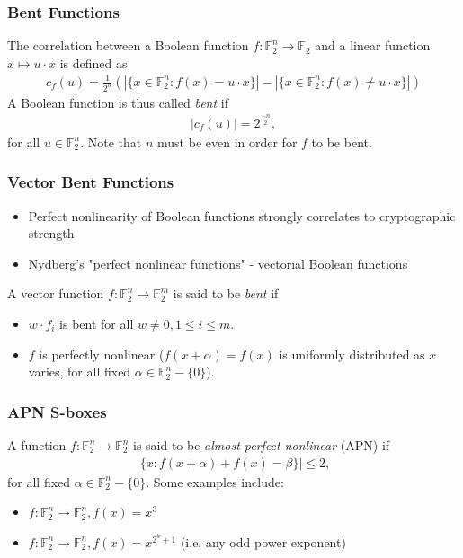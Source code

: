 \documentclass[handout]{beamer}
\newcommand{\field}[1]{\mathbb{#1}} %
\begin{document}
\begin{frame}
	\frametitle{Bent Functions}
	The correlation between a Boolean function $f : \field{F}_2^n \to \field{F}_2$ and a linear function $x \mapsto u \cdot x$ is defined as
	\begin{eqnarray*}
	c_f(u) = \frac{1}{2^n}(|\{x \in \field{F}_2^n : f(x) = u \cdot x\}| - |\{x \in \field{F}_2^n : f(x) \not= u \cdot x\}|)
	\end{eqnarray*}
	A Boolean function is thus called \emph{bent} if
	\begin{eqnarray*}
		|c_f(u)| = 2^{\frac{-n}{2}},
	\end{eqnarray*}
	for all $u \in \field{F}_2^n$. Note that $n$ must be even in order for $f$ to be bent.
\end{frame}

\begin{frame}
	\frametitle{Vector Bent Functions}
	\begin{itemize}
		\item Perfect nonlinearity of Boolean functions strongly correlates to cryptographic strength
		\item Nydberg's "perfect nonlinear functions" - vectorial Boolean functions
	\end{itemize}
	A vector function $f : \field{F}_2^n \to \field{F}_2^m$ is said to be \emph{bent} if
	\begin{itemize}
		\item $w \cdot f_i$ is bent for all $w \not= 0, 1 \leq i \leq m$.
		\item $f$ is perfectly nonlinear ($f(x + \alpha) = f(x)$ is uniformly distributed as $x$ varies, for all fixed $\alpha \in \field{F}_2^n - \{0\}$).
	\end{itemize}
\end{frame}

\begin{frame}
	\frametitle{APN S-boxes}
	A function $f : \field{F}_2^n \to \field{F}_2^n$ is said to be \emph{almost perfect nonlinear} (APN) if
	\begin{eqnarray*}
		|\{x : f(x + \alpha) + f(x) = \beta\}| \leq 2,
	\end{eqnarray*}
	for all fixed $\alpha \in \field{F}_2^n - \{0\}$. Some examples include:
	\begin{itemize}
		\item $f : \field{F}_2^n \to \field{F}_2^n, f(x) = x^3$
		\item $f : \field{F}_2^n \to \field{F}_2^n, f(x) = x^{2^{k} + 1}$ (i.e. any odd power exponent)
	\end{itemize}
\end{frame}
\end{document}
